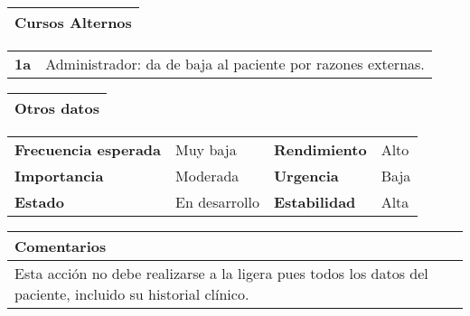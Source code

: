 \documentclass[11pt,a4paper]{article}
\begin{document}
\begin{table}[H]
	\begin{tabularx}{\textwidth}{X}
		\textbf{Cursos Alternos}\\ \hline
	\end{tabularx}
	
	\begin{tabularx}{\textwidth}{cX}
		\textbf{1a} & Administrador: da de baja al paciente por razones externas.
	\end{tabularx}
	
\end{table}

\begin{table}[H]
	\begin{tabularx}{\textwidth}{X}
		\textbf{Otros datos}\\ \hline
	\end{tabularx}
	\begin{tabularx}{\textwidth}{lXlX}
		\textbf{Frecuencia esperada} & Muy baja & \textbf{Rendimiento} & Alto\\
		\textbf{Importancia} & Moderada & \textbf{Urgencia} & Baja \\
		\textbf{Estado} & En desarrollo & \textbf{Estabilidad} & Alta\\
	\end{tabularx}
	
	\begin{tabularx}{\textwidth}{X}
		\textbf{Comentarios}\\ \hline
		Esta acción no debe realizarse a la ligera pues todos los datos del paciente, incluido su historial clínico.
	\end{tabularx}
\end{table}

\end{document}
